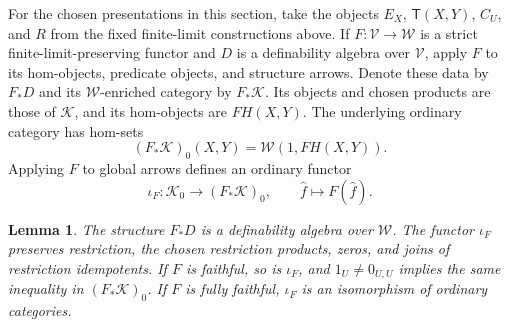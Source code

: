 \documentclass[11pt]{article}
\newtheorem{lemma}[theorem]{Lemma}
\theoremstyle{definition}
\theoremstyle{remark}
\begin{document}
For the chosen presentations in this section, take the objects
$E_X$, $\mathsf T(X,Y)$, $C_U$, and $R$ from the fixed finite-limit
constructions above. If $F:\mathscr V\to\mathscr W$ is a strict
finite-limit-preserving functor and $D$ is a definability algebra
over $\mathscr V$, apply $F$ to its hom-objects, predicate objects,
and structure arrows. Denote these data by $F_*D$ and its
$\mathscr W$-enriched category by $F_*\mathcal K$. Its objects
and chosen products are those of $\mathcal K$, and its hom-objects
are $FH(X,Y)$. The underlying ordinary category has hom-sets
\[
 (F_*\mathcal K)_0(X,Y)=\mathscr W(1,FH(X,Y)).
\]
Applying $F$ to global arrows defines an ordinary functor
\[
 \iota_F:\mathcal K_0\longrightarrow(F_*\mathcal K)_0,
 \qquad \widehat f\longmapsto F(\widehat f).
\]

\begin{lemma}\label{lem:definability-base-change}
The structure $F_*D$ is a definability algebra over $\mathscr W$.
The functor $\iota_F$ preserves restriction, the chosen restriction
products, zeros, and joins of restriction idempotents. If $F$ is faithful, so is
$\iota_F$, and $1_U\ne0_{U,U}$ implies the same inequality in
$(F_*\mathcal K)_0$. If $F$ is fully faithful, $\iota_F$ is an
isomorphism of ordinary categories.
\end{lemma}
\end{document}
